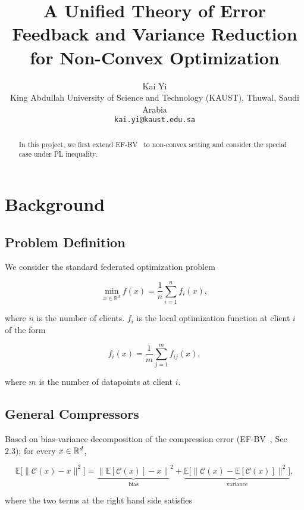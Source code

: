 \documentclass{article} %
\title{A Unified Theory of Error Feedback and Variance Reduction for Non-Convex Optimization}
\author{Kai Yi\\
   King Abdullah University of Science and Technology (KAUST), Thuwal, Saudi Arabia\\
   \texttt{kai.yi@kaust.edu.sa}
}
\newcommand{\algname}[1]{{\sf\green\relscale{0.90}#1}\xspace}
\theoremstyle{plain}
\theoremstyle{definition}
\theoremstyle{remark}
\newcommand{\green}{\color{mydarkgreen}}
\begin{document}
\maketitle


\begin{abstract}  
In this project, we first extend EF-BV~\cite{condat2022ef} to non-convex setting and consider the special case under PL inequality. 
\end{abstract}

\tableofcontents
\newpage

\section{Background}
\subsection{Problem Definition}
We consider the standard federated optimization problem

\begin{equation}
   \min_{x\in\mathbb{R}^d} f(x) = \frac{1}{n}\sum_{i=1}^n f_i (x),
\end{equation}

where $n$ is the number of clients. $f_i$ is the local optimization function at client $i$ of the form 

\begin{equation}
   f_i(x) = \frac{1}{m} \sum_{j=1}^m f_{ij} (x),
\end{equation}

where $m$ is the number of datapoints at client $i$. 

\subsection{General Compressors}
Based on bias-variance decomposition of the compression error (\algname{EF-BV}~\cite{condat2022ef}, Sec 2.3); for every $x\in \mathbb{R}^d$,

\begin{equation}
   \mathbb{E}\big[\|\mathcal{C}(x)-x\|^2\big] = {\underbrace{\big\| \mathbb{E}[\mathcal{C}(x)]-x\big\|}_{\text{bias}}}^2 + \underbrace{\mathbb{E}\Big[\big\|\mathcal{C}(x)-\mathbb{E}[\mathcal{C}(x)]\big\|^2\Big]}_{\text{variance}},\label{eqbiva}
   \end{equation}

where the two terms at the right hand side satisfies
\end{document}
